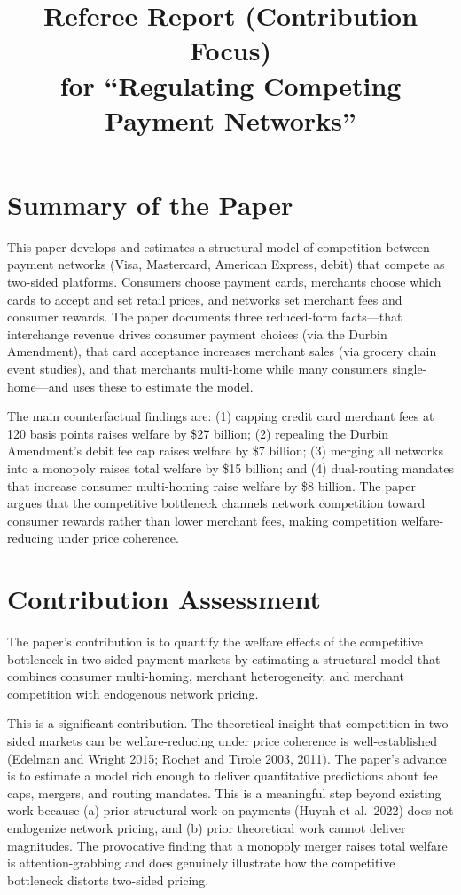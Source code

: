 \documentclass[11pt]{article}
\begin{document}
\title{Referee Report (Contribution Focus)\\for ``Regulating Competing Payment Networks''}
\author{}
\date{}
\maketitle

\section{Summary of the Paper}

This paper develops and estimates a structural model of competition between payment networks (Visa, Mastercard, American Express, debit) that compete as two-sided platforms. Consumers choose payment cards, merchants choose which cards to accept and set retail prices, and networks set merchant fees and consumer rewards. The paper documents three reduced-form facts---that interchange revenue drives consumer payment choices (via the Durbin Amendment), that card acceptance increases merchant sales (via grocery chain event studies), and that merchants multi-home while many consumers single-home---and uses these to estimate the model.

The main counterfactual findings are: (1) capping credit card merchant fees at 120 basis points raises welfare by \$27 billion; (2) repealing the Durbin Amendment's debit fee cap raises welfare by \$7 billion; (3) merging all networks into a monopoly raises total welfare by \$15 billion; and (4) dual-routing mandates that increase consumer multi-homing raise welfare by \$8 billion. The paper argues that the competitive bottleneck channels network competition toward consumer rewards rather than lower merchant fees, making competition welfare-reducing under price coherence.

\section{Contribution Assessment}

The paper's contribution is to quantify the welfare effects of the competitive bottleneck in two-sided payment markets by estimating a structural model that combines consumer multi-homing, merchant heterogeneity, and merchant competition with endogenous network pricing.

This is a significant contribution. The theoretical insight that competition in two-sided markets can be welfare-reducing under price coherence is well-established (Edelman and Wright 2015; Rochet and Tirole 2003, 2011). The paper's advance is to estimate a model rich enough to deliver quantitative predictions about fee caps, mergers, and routing mandates. This is a meaningful step beyond existing work because (a) prior structural work on payments (Huynh et al.\ 2022) does not endogenize network pricing, and (b) prior theoretical work cannot deliver magnitudes. The provocative finding that a monopoly merger raises total welfare is attention-grabbing and does genuinely illustrate how the competitive bottleneck distorts two-sided pricing.
\end{document}

